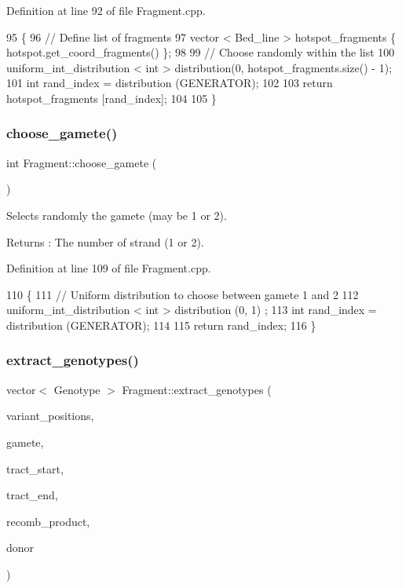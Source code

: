 Definition at line 92 of file Fragment.\+cpp.


\begin{DoxyCode}
95 \{
96     \textcolor{comment}{// Define list of fragments}
97     vector < Bed\_line > hotspot\_fragments \{ hotspot.get\_coord\_fragments() \};
98     
99     \textcolor{comment}{// Choose randomly within the list}
100     uniform\_int\_distribution < int > distribution(0, hotspot\_fragments.size() - 1);
101     \textcolor{keywordtype}{int} rand\_index = distribution (GENERATOR);
102     
103     \textcolor{keywordflow}{return} hotspot\_fragments [rand\_index];
104 
105 \}
\end{DoxyCode}
\mbox{\label{class_fragment_af0b7207f40388ef97fe23bf05930ec59}} 
\subsubsection{\texorpdfstring{choose\+\_\+gamete()}{choose\_gamete()}}
{\footnotesize\ttfamily int Fragment\+::choose\+\_\+gamete (\begin{DoxyParamCaption}{ }\end{DoxyParamCaption})}

Selects randomly the gamete (may be 1 or 2). \begin{DoxyReturn}{Returns}
\+: The number of strand (1 or 2). 
\end{DoxyReturn}


Definition at line 109 of file Fragment.\+cpp.


\begin{DoxyCode}
110 \{
111     \textcolor{comment}{// Uniform distribution to choose between gamete 1 and 2}
112     uniform\_int\_distribution < int > distribution (0, 1) ;
113     \textcolor{keywordtype}{int} rand\_index = distribution (GENERATOR);
114     
115     \textcolor{keywordflow}{return} rand\_index;
116 \}
\end{DoxyCode}
\mbox{\label{class_fragment_a377530f10a70d0c252bdb6bd4f8b5234}} 
\subsubsection{\texorpdfstring{extract\+\_\+genotypes()}{extract\_genotypes()}}
{\footnotesize\ttfamily vector$<$ Genotype $>$ Fragment\+::extract\+\_\+genotypes (\begin{DoxyParamCaption}\item[{Int\+Vector}]{variant\+\_\+positions,  }\item[{int}]{gamete,  }\item[{int}]{tract\+\_\+start,  }\item[{int}]{tract\+\_\+end,  }\item[{Recomb\+\_\+product}]{recomb\+\_\+product,  }\item[{Genotype}]{donor }\end{DoxyParamCaption})}

